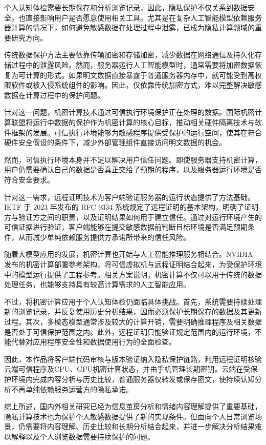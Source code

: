个人认知体检需要长期保存和分析浏览记录，因此，隐私保护不仅关系到数据安全，也直接影响用户是否愿意使用相关工具。尤其是在复杂人工智能模型依赖服务器计算的情况下，如何避免敏感数据在处理过程中泄露，已成为隐私计算领域的重要研究方向。

传统数据保护方法主要依靠传输加密和存储加密，减少数据在网络通信及持久化存储过程中的泄露风险。然而，服务器运行人工智能模型时，通常需要将加密数据恢复为可计算的形式。如果明文数据直接暴露于普通服务器内存中，就可能受到高权限软件或被入侵系统组件的影响。因此，仅依靠传统加密方式，难以完整解决敏感数据在计算过程中的保护问题。

针对这一问题，机密计算技术通过可信执行环境保护正在处理的数据。国际机密计算联盟将运行中数据的保护作为机密计算的核心目标，推动相关硬件隔离技术与软件框架的发展\cite{ref10}。可信执行环境能够为敏感程序提供受保护的运行空间，使其在符合硬件安全假设的条件下，减少外部管理组件直接访问明文数据的机会。

然而，可信执行环境本身并不足以解决用户信任问题。即使服务器支持机密计算，用户仍需要确认自己的数据是否真正交给了预期的程序，以及服务器运行环境是否符合安全要求。

针对这一需求，远程证明技术为客户端验证服务器的运行状态提供了方法基础。IETF 于 2023 年发布的 RFC 9334 系统规定了远程证明的基本架构，明确了证明方与验证方之间的职责，以及证明结果如何用于建立信任\cite{ref11}。通过对运行环境产生的可信证据进行验证，客户端能够在提交敏感数据前判断目标环境是否满足预期条件，从而减少单纯依赖服务提供方承诺所带来的信任风险。

随着大模型应用的发展，机密计算也开始与人工智能推理服务相结合。NVIDIA 发布的机密计算部署参考架构，将可信虚拟机与远程证明结合起来，为受保护环境中的模型运行提供了工程参考\cite{ref17}。相关方案说明，机密计算不仅可以用于传统的数据处理任务，也能够支持具有较高计算需求的人工智能应用。

不过，将机密计算应用于个人认知体检仍面临具体挑战。首先，系统需要持续处理新的浏览记录，并反复使用历史分析结果，因而必须保护长期保存的数据及其更新过程。其次，多模态模型通常涉及较大的计算开销，需要明确推理程序及相关数据是否处于可信保护范围之内。此外，远程证明只能验证规定范围内的运行环境，不能代替对应用程序安全性和数据使用行为的全面检查。

因此，本作品将客户端代码审核与版本验证纳入隐私保护链路，利用远程证明核验云端可信程序及CPU、GPU机密计算状态，并由手机管理长期密钥。云端在受保护环境内完成内容分析与历史比较，普通服务器仅转发或保存密文，使持续认知分析不再单纯依赖服务运营方的隐私承诺。

综上所述，国内外相关研究已经为信息茧房分析和情绪内容理解提供了重要基础，隐私计算技术也为保护个人敏感数据提供了新的实现条件。但面向个人日常浏览场景，仍需要将内容理解、历史比较和长期分析结合起来，并进一步解决分析结果难以解释以及个人浏览数据需要持续保护的问题。

